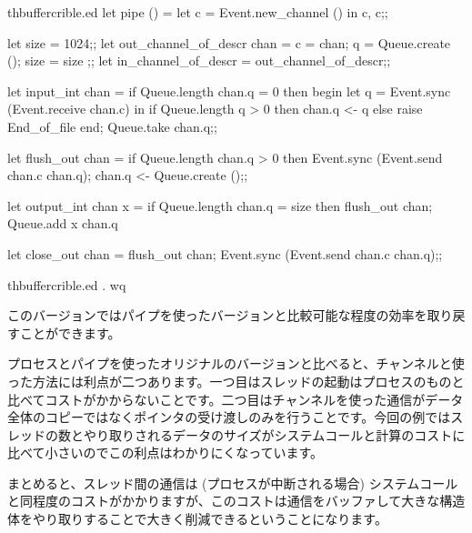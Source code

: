 \begin{example}
\begin{listingcodefile}{thbuffercrible.ed}
let pipe () = let c = Event.new_channel () in c, c;;

let size = 1024;;
let out_channel_of_descr chan =
  { c = chan; q = Queue.create (); size = size };;
let in_channel_of_descr = out_channel_of_descr;;

let input_int chan =
  if Queue.length chan.q = 0 then begin
    let q = Event.sync (Event.receive chan.c) in
    if Queue.length q > 0 then chan.q <- q
    else raise End_of_file
  end;
  Queue.take chan.q;;

let flush_out chan =
  if Queue.length chan.q > 0 then Event.sync (Event.send chan.c chan.q);
  chan.q <- Queue.create ();;

let output_int chan x =
  if Queue.length chan.q = size then flush_out chan;
  Queue.add x chan.q

let close_out chan =
  flush_out chan;
  Event.sync (Event.send chan.c chan.q);;
\end{listingcodefile}
%
\begin{codefile}{thbuffercrible.ed}
.
wq
\end{codefile}
%
このバージョンではパイプを使ったバージョンと比較可能な程度の効率を取り戻すことができます。

プロセスとパイプを使ったオリジナルのバージョンと比べると、チャンネルと使った方法には利点が二つあります。一つ目はスレッドの起動はプロセスのものと比べてコストがかからないことです。二つ目はチャンネルを使った通信がデータ全体のコピーではなくポインタの受け渡しのみを行うことです。今回の例ではスレッドの数とやり取りされるデータのサイズがシステムコールと計算のコストに比べて小さいのでこの利点はわかりにくなっています。

まとめると、スレッド間の通信は (プロセスが中断される場合) システムコールと同程度のコストがかかりますが、このコストは通信をバッファして大きな構造体をやり取りすることで大きく削減できるということになります。
\end{example}

